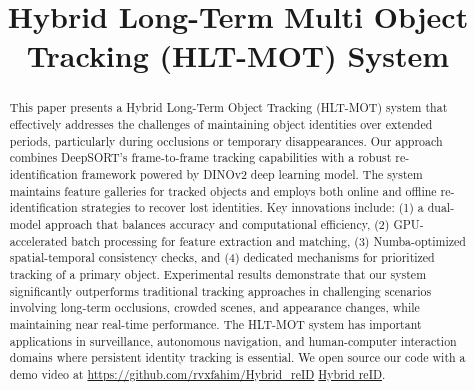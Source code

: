 \documentclass[conference]{IEEEtran}
\begin{document}
\title{Hybrid Long-Term Multi Object Tracking (HLT-MOT) System\\
}

\author{
\and
{}
\and
{}
}

\maketitle

\begin{abstract}
This paper presents a Hybrid Long-Term Object Tracking (HLT-MOT) system that effectively addresses the challenges of maintaining object identities over extended periods, particularly during occlusions or temporary disappearances. Our approach combines DeepSORT's frame-to-frame tracking capabilities with a robust re-identification framework powered by DINOv2 deep learning model. The system maintains feature galleries for tracked objects and employs both online and offline re-identification strategies to recover lost identities. Key innovations include: (1) a dual-model approach that balances accuracy and computational efficiency, (2) GPU-accelerated batch processing for feature extraction and matching, (3) Numba-optimized spatial-temporal consistency checks, and (4) dedicated mechanisms for prioritized tracking of a primary object. Experimental results demonstrate that our system significantly outperforms traditional tracking approaches in challenging scenarios involving long-term occlusions, crowded scenes, and appearance changes, while maintaining near real-time performance. The HLT-MOT system has important applications in surveillance, autonomous navigation, and human-computer interaction domains where persistent identity tracking is essential.
We open source our code with a demo video at \url{https://github.com/rvxfahim/Hybrid_reID} \href{https://github.com/rvxfahim/Hybrid_reID}{Hybrid reID}.
\end{abstract}
\end{document}
